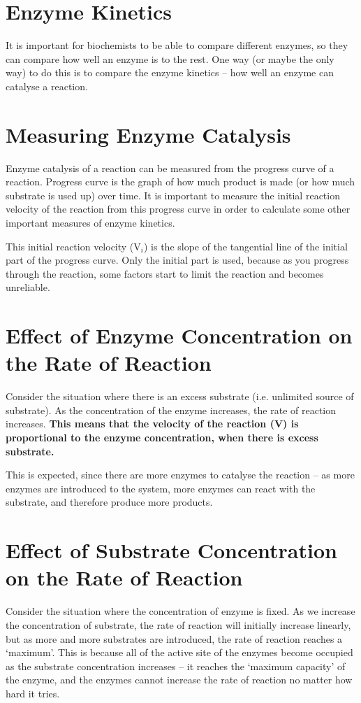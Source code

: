 \section{Enzyme Kinetics}

It is important for biochemists to be able to compare different enzymes, so they can compare how well an enzyme is to the rest.
One way (or maybe the only way) to do this is to compare the enzyme kinetics -- how well an enzyme can catalyse a reaction.

\section{Measuring Enzyme Catalysis}

Enzyme catalysis of a reaction can be measured from the progress curve of a reaction.
Progress curve is the graph of how much product is made (or how much substrate is used up) over time.
It is important to measure the initial reaction velocity of the reaction from this progress curve in order to calculate some other important measures of enzyme kinetics.

This initial reaction velocity (V$_i$) is the slope of the tangential line of the initial part of the progress curve.
Only the initial part is used, because as you progress through the reaction, some factors start to limit the reaction and becomes unreliable.

\section{Effect of Enzyme Concentration on the Rate of Reaction}

Consider the situation where there is an excess substrate (i.e. unlimited source of substrate).
As the concentration of the enzyme increases, the rate of reaction increases.
\textbf{This means that the velocity of the reaction (V) is proportional to the enzyme concentration, when there is excess substrate.}

This is expected, since there are more enzymes to catalyse the reaction -- as more enzymes are introduced to the system, more enzymes can react with the substrate, and therefore produce more products.

\section{Effect of Substrate Concentration on the Rate of Reaction}

Consider the situation where the concentration of enzyme is fixed.
As we increase the concentration of substrate, the rate of reaction will initially increase linearly, but as more and more substrates are introduced, the rate of reaction reaches a `maximum'.
This is because all of the active site of the enzymes become occupied as the substrate concentration increases -- it reaches the `maximum capacity' of the enzyme, and the enzymes cannot increase the rate of reaction no matter how hard it tries.

